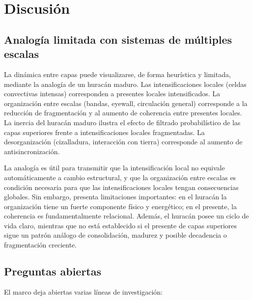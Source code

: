 \section{Discusión}

\subsection{Analogía limitada con sistemas de múltiples escalas}

La dinámica entre capas puede visualizarse, de forma heurística y limitada, mediante la analogía de un huracán maduro. Las intensificaciones locales (celdas convectivas intensas) corresponden a presentes locales intensificados. La organización entre escalas (bandas, eyewall, circulación general) corresponde a la reducción de fragmentación y al aumento de coherencia entre presentes locales. La inercia del huracán maduro ilustra el efecto de filtrado probabilístico de las capas superiores frente a intensificaciones locales fragmentadas. La desorganización (cizalladura, interacción con tierra) corresponde al aumento de antisincronización.

La analogía es útil para transmitir que la intensificación local no equivale automáticamente a cambio estructural, y que la organización entre escalas es condición necesaria para que las intensificaciones locales tengan consecuencias globales. Sin embargo, presenta limitaciones importantes: en el huracán la organización tiene un fuerte componente físico y energético; en el presente, la coherencia es fundamentalmente relacional. Además, el huracán posee un ciclo de vida claro, mientras que no está establecido si el presente de capas superiores sigue un patrón análogo de consolidación, madurez y posible decadencia o fragmentación creciente.

\subsection{Preguntas abiertas}

El marco deja abiertas varias líneas de investigación:


